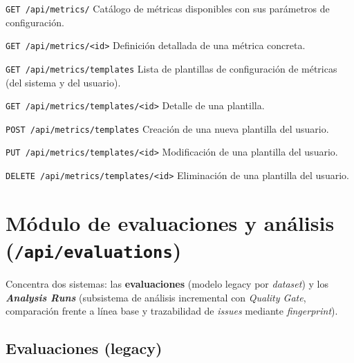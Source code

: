 \begin{definitionlist}
  \item[\texttt{GET /api/metrics/}]  Catálogo de métricas disponibles con
    sus parámetros de configuración.

  \item[\texttt{GET /api/metrics/<id>}]  Definición detallada de una
    métrica concreta.

  \item[\texttt{GET /api/metrics/templates}]  Lista de plantillas de
    configuración de métricas (del sistema y del usuario).

  \item[\texttt{GET /api/metrics/templates/<id>}]  Detalle de una plantilla.

  \item[\texttt{POST /api/metrics/templates}]  Creación de una nueva
    plantilla del usuario.

  \item[\texttt{PUT /api/metrics/templates/<id>}]  Modificación de una
    plantilla del usuario.

  \item[\texttt{DELETE /api/metrics/templates/<id>}]  Eliminación de una
    plantilla del usuario.
\end{definitionlist}


\section{Módulo de evaluaciones y análisis (\texttt{/api/evaluations})}
\label{sec:api-evaluations}

Concentra dos sistemas: las \textbf{evaluaciones} (modelo legacy por
\emph{dataset}) y los \textbf{\emph{Analysis Runs}} (subsistema de análisis incremental
con \emph{Quality Gate}, comparación frente a línea base y trazabilidad
de \emph{issues} mediante \emph{fingerprint}).

\subsection*{Evaluaciones (legacy)}


